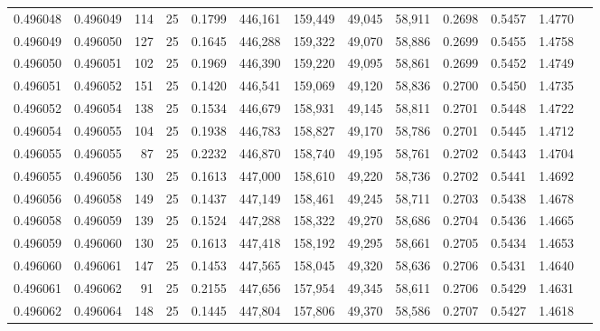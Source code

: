 \begin{tabular}{rrrrrrrrrrrrr}
0.496048 & 0.496049 &   114 &  25 &                                     0.1799 & 446,161 & 159,449 &  49,045 &  58,911 & 0.2698 & 0.5457 & 1.4770 \\
0.496049 & 0.496050 &   127 &  25 &                                     0.1645 & 446,288 & 159,322 &  49,070 &  58,886 & 0.2699 & 0.5455 & 1.4758 \\
0.496050 & 0.496051 &   102 &  25 &                                     0.1969 & 446,390 & 159,220 &  49,095 &  58,861 & 0.2699 & 0.5452 & 1.4749 \\
0.496051 & 0.496052 &   151 &  25 &                                     0.1420 & 446,541 & 159,069 &  49,120 &  58,836 & 0.2700 & 0.5450 & 1.4735 \\
0.496052 & 0.496054 &   138 &  25 &                                     0.1534 & 446,679 & 158,931 &  49,145 &  58,811 & 0.2701 & 0.5448 & 1.4722 \\
0.496054 & 0.496055 &   104 &  25 &                                     0.1938 & 446,783 & 158,827 &  49,170 &  58,786 & 0.2701 & 0.5445 & 1.4712 \\
0.496055 & 0.496055 &    87 &  25 &                                     0.2232 & 446,870 & 158,740 &  49,195 &  58,761 & 0.2702 & 0.5443 & 1.4704 \\
0.496055 & 0.496056 &   130 &  25 &                                     0.1613 & 447,000 & 158,610 &  49,220 &  58,736 & 0.2702 & 0.5441 & 1.4692 \\
0.496056 & 0.496058 &   149 &  25 &                                     0.1437 & 447,149 & 158,461 &  49,245 &  58,711 & 0.2703 & 0.5438 & 1.4678 \\
0.496058 & 0.496059 &   139 &  25 &                                     0.1524 & 447,288 & 158,322 &  49,270 &  58,686 & 0.2704 & 0.5436 & 1.4665 \\
0.496059 & 0.496060 &   130 &  25 &                                     0.1613 & 447,418 & 158,192 &  49,295 &  58,661 & 0.2705 & 0.5434 & 1.4653 \\
0.496060 & 0.496061 &   147 &  25 &                                     0.1453 & 447,565 & 158,045 &  49,320 &  58,636 & 0.2706 & 0.5431 & 1.4640 \\
0.496061 & 0.496062 &    91 &  25 &                                     0.2155 & 447,656 & 157,954 &  49,345 &  58,611 & 0.2706 & 0.5429 & 1.4631 \\
0.496062 & 0.496064 &   148 &  25 &                                     0.1445 & 447,804 & 157,806 &  49,370 &  58,586 & 0.2707 & 0.5427 & 1.4618 \\

\end{tabular}

